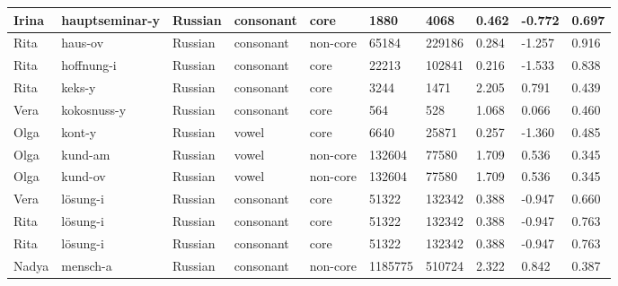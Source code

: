 \begin{longtable}{|p{1.2cm}|p{3cm}|p{1cm}|p{1.5cm}|p{1.5cm}|R{1.2cm}|R{1cm}|R{1cm}|R{0.8cm}|R{0.8cm}|}
Irina     & hauptseminar-y         & Russian       & consonant        & core      & 1880         & 4068           & 0.462                 & -0.772            & 0.697        \\ \hline
Rita      & haus-ov                & Russian       & consonant        & non-core  & 65184        & 229186         & 0.284                 & -1.257            & 0.916        \\ \hline
Rita      & hoffnung-i             & Russian       & consonant        & core      & 22213        & 102841         & 0.216                 & -1.533            & 0.838        \\ \hline
Rita      & keks-y                 & Russian       & consonant        & core      & 3244         & 1471           & 2.205                 & 0.791             & 0.439        \\ \hline
Vera      & kokosnuss-y            & Russian       & consonant        & core      & 564          & 528            & 1.068                 & 0.066             & 0.460        \\ \hline
Olga      & kont-y                 & Russian       & vowel            & core      & 6640         & 25871          & 0.257                 & -1.360            & 0.485        \\ \hline
Olga      & kund-am                & Russian       & vowel            & non-core  & 132604       & 77580          & 1.709                 & 0.536             & 0.345        \\ \hline
Olga      & kund-ov                & Russian       & vowel            & non-core  & 132604       & 77580          & 1.709                 & 0.536             & 0.345        \\ \hline
Vera      & l\"{o}sung-i           & Russian       & consonant        & core      & 51322        & 132342         & 0.388                 & -0.947            & 0.660        \\ \hline
Rita      & l\"{o}sung-i           & Russian       & consonant        & core      & 51322        & 132342         & 0.388                 & -0.947            & 0.763        \\ \hline
Rita      & l\"{o}sung-i           & Russian       & consonant        & core      & 51322        & 132342         & 0.388                 & -0.947            & 0.763        \\ \hline
Nadya     & mensch-a               & Russian       & consonant        & non-core  & 1185775      & 510724         & 2.322                 & 0.842             & 0.387        \\ \hline

\end{longtable}
